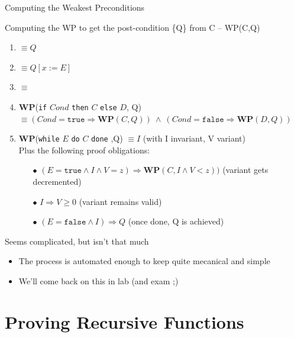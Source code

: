 \begin{frame}{Computing the Weakest Preconditions}
  \begin{block}{Computing the WP to get the post-condition \{Q\}
      from C -- WP(C,Q)}
    \begin{enumerate}
\item {}  $\equiv Q$
\item {} $\equiv Q[x:=E]$
\item {}  $\equiv$ 
\item \textbf{WP}(\texttt{if} $Cond$ \texttt{then} $C$ \texttt{else} $D$, Q)
  $\equiv (Cond=\mathtt{true}\Rightarrow \mathbf{WP}(C,Q))~\wedge~
          (Cond=\mathtt{false}\Rightarrow \mathbf{WP}(D,Q))$
\item \textbf{WP}(\texttt{while} $E$ \texttt{do} $C$ \texttt{done} ,Q) %
  $\equiv I$ \hfill (with I invariant, V variant)\\
  Plus the following proof obligations:
  \begin{itemize}
  \item[$\bullet$] $(E=\mathtt{true}\wedge I\wedge V=z) \Rightarrow
    \mathbf{WP}(C,I\wedge V<z))$
    \hfill(variant gets decremented)
  \item[$\bullet$] $I\Rightarrow V\geq 0$
    \hfill (variant remains valid)
  \item[$\bullet$] $(E=\mathtt{false}\wedge I) \Rightarrow Q$
    \hfill (once done, Q is achieved)
  \end{itemize}
\end{enumerate}

  \end{block}

  \begin{block}{Seems complicated, but isn't that much}
    \begin{itemize}
    \item The process is automated enough to keep quite mecanical and simple
    \item We'll come back on this in lab (and exam ;)
    \end{itemize}
  \end{block}
\end{frame}
\section{Proving Recursive Functions}\sectionpage

